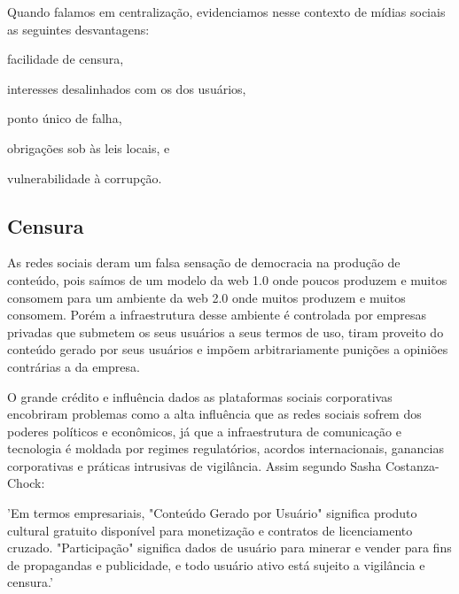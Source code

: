 Quando falamos em centralização, evidenciamos nesse contexto de mídias sociais as seguintes desvantagens:
\begin{enumerate*}[label=(\arabic*)]
    \item facilidade de censura,
    \item interesses desalinhados com os dos usuários,
    \item ponto único de falha,
    \item obrigações sob às leis locais, e
    \item vulnerabilidade à corrupção.
\end{enumerate*}

\subsection{Censura}
As redes sociais deram um falsa sensação de democracia na produção de conteúdo, pois saímos de um modelo da web 1.0 onde poucos produzem e muitos consomem para um ambiente da web 2.0 onde muitos produzem e muitos consomem. Porém a infraestrutura desse ambiente é controlada por empresas privadas que submetem os seus usuários a seus termos de uso, tiram proveito do conteúdo gerado por seus usuários e impõem arbitrariamente punições a opiniões contrárias a da empresa.

O grande crédito e influência dados as plataformas sociais corporativas encobriram  problemas como a alta influência que as redes sociais sofrem dos poderes políticos e econômicos, já que a infraestrutura de comunicação e tecnologia é moldada por regimes regulatórios, acordos internacionais, ganancias corporativas e práticas intrusivas de vigilância. Assim segundo Sasha Costanza-Chock\cite{Censura1}:


\begin{directcite}
'Em termos empresariais, "Conteúdo Gerado por Usuário" significa produto cultural gratuito disponível para monetização e contratos de licenciamento cruzado. "Participação" significa dados de usuário para minerar e vender para fins de propagandas e publicidade, e todo usuário ativo está sujeito a vigilância e censura.'
\end{directcite}





